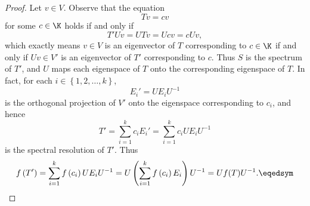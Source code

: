 \documentclass[linearalgebra]{subfiles}
\begin{document}
    \begin{proof}
        Let $v\in V$. Observe that the equation
        \begin{equation*}
            Tv = cv
        \end{equation*}
        for some $c\in\K$ holds if and only if
        \begin{equation*}
            T'Uv = UTv = Ucv = cUv,
        \end{equation*}
        which exactly means $v\in V$ is an eigenvector of $T$ corresponding to $c\in\K$ if and only if $Uv\in V'$ is an eigenvector of $T'$ corresponding to $c$. Thus $S$ is the spectrum of $T'$, and $U$ maps each eigenspace of $T$ onto the corresponding eigenspace of $T$. In fact, for each $i\in\left\lbrace 1,2,\ldots,k \right\rbrace $,
        \begin{equation*}
            E_i' = UE_iU^{-1}
        \end{equation*}
        is the orthogonal projection of $V'$ onto the eigenspace corresponding to $c_i$, and hence
        \begin{equation*}
            T' = \sum^{k}_{i=1} c_iE_i' = \sum^{k}_{i=1} c_iUE_iU^{-1}
        \end{equation*}
        is the spectral resolution of $T'$. Thus
        \begin{equation*}
            f\left( T' \right) = \sum^{k}_{i=1} f\left( c_i \right) UE_iU^{-1} = U \left( \sum^{k}_{i=1} f\left( c_i \right) E_i \right) U^{-1} = Uf(T)U^{-1}.\eqedsym
        \end{equation*}
    \end{proof}
\end{document}
